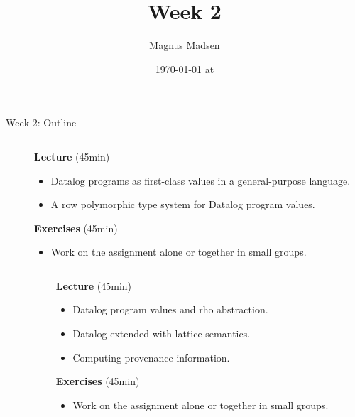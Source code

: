 

\title{Week 2}
\date{\today{} at \currenttime{}}
\author{Magnus Madsen}



\maketitle

\begin{frame}{Week 2: Outline}
\begin{columns}
\begin{column}{.05\textwidth}
\end{column}
\begin{column}{.95\textwidth}
    \footnotesize
\textbf{Lecture} (45min)  \vspace{-2mm}
\begin{itemize}
    \setlength\itemsep{-0.5em}
    \item Datalog programs as first-class values in a general-purpose language.
    \item A row polymorphic type system for Datalog program values.
\end{itemize}
\textbf{Exercises} (45min) \vspace{-2mm}
\begin{itemize}
    \item Work on the assignment alone or together in small groups.
\end{itemize}
\end{column}
\end{columns}

\medskip
\medskip
\medskip

\begin{columns}
\color{gray}
\begin{column}{.05\textwidth}
\end{column}
\begin{column}{.95\textwidth}
\footnotesize
\textbf{Lecture} (45min) \vspace{-2mm}
\begin{itemize}
    \color{gray}
    \setlength\itemsep{-0.5em}
    \item Datalog program values and rho abstraction.
    \item Datalog extended with lattice semantics.
    \item Computing provenance information.
\end{itemize}
\textbf{Exercises} (45min)  \vspace{-2mm}
\begin{itemize}
    \color{gray}
    \item Work on the assignment alone or together in small groups.
\end{itemize}
\end{column}
\end{columns}
\end{frame}

